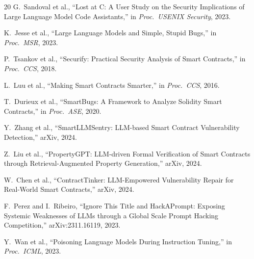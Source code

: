 \documentclass[11pt]{article}
\begin{document}
\begin{thebibliography}{20}
 G.~Sandoval et al., ``Lost at C: A User Study on the Security Implications of Large Language Model Code Assistants,'' in \textit{Proc.\ USENIX Security}, 2023.

 K.~Jesse et al., ``Large Language Models and Simple, Stupid Bugs,'' in \textit{Proc.\ MSR}, 2023.

 P.~Tsankov et al., ``Securify: Practical Security Analysis of Smart Contracts,'' in \textit{Proc.\ CCS}, 2018.

 L.~Luu et al., ``Making Smart Contracts Smarter,'' in \textit{Proc.\ CCS}, 2016.

 T.~Durieux et al., ``SmartBugs: A Framework to Analyze Solidity Smart Contracts,'' in \textit{Proc.\ ASE}, 2020.

 Y.~Zhang et al., ``SmartLLMSentry: LLM-based Smart Contract Vulnerability Detection,'' arXiv, 2024.

 Z.~Liu et al., ``PropertyGPT: LLM-driven Formal Verification of Smart Contracts through Retrieval-Augmented Property Generation,'' arXiv, 2024.

 W.~Chen et al., ``ContractTinker: LLM-Empowered Vulnerability Repair for Real-World Smart Contracts,'' arXiv, 2024.

 F.~Perez and I.~Ribeiro, ``Ignore This Title and HackAPrompt: Exposing Systemic Weaknesses of LLMs through a Global Scale Prompt Hacking Competition,'' arXiv:2311.16119, 2023.

 Y.~Wan et al., ``Poisoning Language Models During Instruction Tuning,'' in \textit{Proc.\ ICML}, 2023.

\end{thebibliography}
\end{document}
